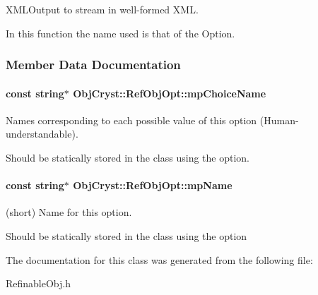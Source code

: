X\-M\-L\-Output to stream in well-\/formed X\-M\-L. 

In this function the name used is that of the Option. 

\subsubsection{Member Data Documentation}
\paragraph[{mp\-Choice\-Name}]{\setlength{\rightskip}{0pt plus 5cm}const string$\ast$ Obj\-Cryst\-::\-Ref\-Obj\-Opt\-::mp\-Choice\-Name\hspace{0.3cm}{\ttfamily [protected]}}\label{a00084_abc47d0f345c4121b6492e754b30f4fef}


Names corresponding to each possible value of this option (Human-\/understandable). 

Should be statically stored in the class using the option. 
\paragraph[{mp\-Name}]{\setlength{\rightskip}{0pt plus 5cm}const string$\ast$ Obj\-Cryst\-::\-Ref\-Obj\-Opt\-::mp\-Name\hspace{0.3cm}{\ttfamily [protected]}}\label{a00084_a45eb6eed7f6578f438433acddb2f1eb2}


(short) Name for this option. 

Should be statically stored in the class using the option 

The documentation for this class was generated from the following file\-:\begin{DoxyCompactItemize}
\item 
Refinable\-Obj.\-h\end{DoxyCompactItemize}
